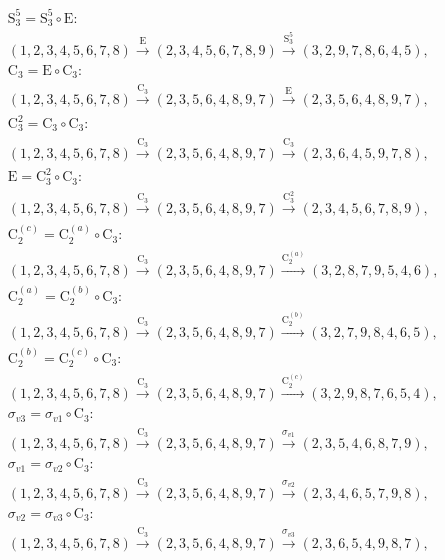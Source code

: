 \begin{align*}
& \mathrm{S}_{3}^{5} = \mathrm{S}_{3}^{5} \circ \mathrm{E}:\; \\& (1,2,3,4,5,6,7,8) \xrightarrow{\mathrm{E}} (2,3,4,5,6,7,8,9) \xrightarrow{\mathrm{S}_{3}^{5}} (3,2,9,7,8,6,4,5), \\
& \mathrm{C}_{3} = \mathrm{E} \circ \mathrm{C}_{3}:\; \\& (1,2,3,4,5,6,7,8) \xrightarrow{\mathrm{C}_{3}} (2,3,5,6,4,8,9,7) \xrightarrow{\mathrm{E}} (2,3,5,6,4,8,9,7), \\
& \mathrm{C}_{3}^{2} = \mathrm{C}_{3} \circ \mathrm{C}_{3}:\; \\& (1,2,3,4,5,6,7,8) \xrightarrow{\mathrm{C}_{3}} (2,3,5,6,4,8,9,7) \xrightarrow{\mathrm{C}_{3}} (2,3,6,4,5,9,7,8), \\
& \mathrm{E} = \mathrm{C}_{3}^{2} \circ \mathrm{C}_{3}:\; \\& (1,2,3,4,5,6,7,8) \xrightarrow{\mathrm{C}_{3}} (2,3,5,6,4,8,9,7) \xrightarrow{\mathrm{C}_{3}^{2}} (2,3,4,5,6,7,8,9), \\
& \mathrm{C}_{2}^{(c)} = \mathrm{C}_{2}^{(a)} \circ \mathrm{C}_{3}:\; \\& (1,2,3,4,5,6,7,8) \xrightarrow{\mathrm{C}_{3}} (2,3,5,6,4,8,9,7) \xrightarrow{\mathrm{C}_{2}^{(a)}} (3,2,8,7,9,5,4,6), \\
& \mathrm{C}_{2}^{(a)} = \mathrm{C}_{2}^{(b)} \circ \mathrm{C}_{3}:\; \\& (1,2,3,4,5,6,7,8) \xrightarrow{\mathrm{C}_{3}} (2,3,5,6,4,8,9,7) \xrightarrow{\mathrm{C}_{2}^{(b)}} (3,2,7,9,8,4,6,5), \\
& \mathrm{C}_{2}^{(b)} = \mathrm{C}_{2}^{(c)} \circ \mathrm{C}_{3}:\; \\& (1,2,3,4,5,6,7,8) \xrightarrow{\mathrm{C}_{3}} (2,3,5,6,4,8,9,7) \xrightarrow{\mathrm{C}_{2}^{(c)}} (3,2,9,8,7,6,5,4), \\
& \sigma_{v3} = \sigma_{v1} \circ \mathrm{C}_{3}:\; \\& (1,2,3,4,5,6,7,8) \xrightarrow{\mathrm{C}_{3}} (2,3,5,6,4,8,9,7) \xrightarrow{\sigma_{v1}} (2,3,5,4,6,8,7,9), \\
& \sigma_{v1} = \sigma_{v2} \circ \mathrm{C}_{3}:\; \\& (1,2,3,4,5,6,7,8) \xrightarrow{\mathrm{C}_{3}} (2,3,5,6,4,8,9,7) \xrightarrow{\sigma_{v2}} (2,3,4,6,5,7,9,8), \\
& \sigma_{v2} = \sigma_{v3} \circ \mathrm{C}_{3}:\; \\& (1,2,3,4,5,6,7,8) \xrightarrow{\mathrm{C}_{3}} (2,3,5,6,4,8,9,7) \xrightarrow{\sigma_{v3}} (2,3,6,5,4,9,8,7), \\

\end{align*}
